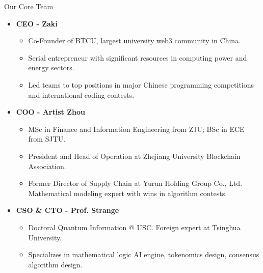 \documentclass{beamer}
\begin{document}
\begin{frame}{Our Core Team}
    \begin{itemize}
        \item \textbf{CEO - Zaki}
\begin{scriptsize}
        \begin{itemize}
            \item Co-Founder of BTCU, largest university web3 community in China.
            \item Serial entrepreneur with significant resources in computing power and energy sectors.
            \item Led teams to top positions in major Chinese programming competitions and international coding contests.
        \end{itemize}
\end{scriptsize}
        
        \item \textbf{COO - Artist Zhou}
\begin{scriptsize}
        \begin{itemize}
            \item MSc in Finance and Information Engineering from ZJU; BSc in ECE from SJTU.
            \item President and Head of Operation at Zhejiang University Blockchain Association.
            \item Former Director of Supply Chain at Yurun Holding Group Co., Ltd. Mathematical modeling expert with wins in algorithm contests.
        \end{itemize}
\end{scriptsize}
        
        \item \textbf{CSO \& CTO - Prof. Strange}
\begin{scriptsize}
        \begin{itemize}
            \item Doctoral Quantum Information @ USC. Foreign expert at Tsinghua University.
            \item Specializes in mathematical logic AI engine, tokenomics design, consensus algorithm design.
        \end{itemize}
\end{scriptsize}
    \end{itemize}
\end{frame}
\end{document}
